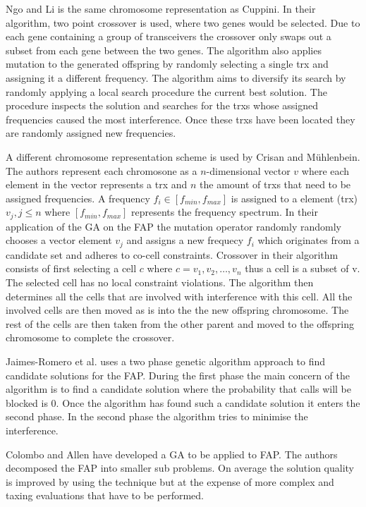 Ngo and Li\cite{} is the same chromosome representation as Cuppini\cite{}. In their algorithm, two point crossover is used, where two genes would be selected. Due to each gene containing a group of transceivers the crossover only swaps out a subset from each gene between the two genes. The algorithm also applies mutation to the generated offspring by randomly selecting a single trx and assigning it a different frequency. The algorithm aims to diversify its search by randomly applying a local search procedure the current best solution. The procedure inspects the solution and searches for the trxs whose assigned frequencies caused the most interference. Once these trxs have been located they are randomly assigned new frequencies.

A different chromosome representation scheme is used by Crisan and Mühlenbein\cite{}. The authors represent each chromosone as a $n$-dimensional vector $v$ where each element in the vector represents a trx and $n$ the amount of trxs that need to be assigned frequencies. A frequency $f_i \in [f_{min}, f_{max}]$ is assigned to a element (trx) $v_j, j \le n$ where $[f_{min}, f_{max}]$ represents the frequency spectrum. In their application of the \gls{GA} on the FAP the mutation operator randomly randomly chooses a vector element $v_j$ and assigns a new frequecy $f_i$ which originates from a candidate set and adheres to co-cell constraints. Crossover in their algorithm consists of first selecting a cell $c$ where $c = {v_1,v_2,\dots,v_n}$ thus a cell is a subset of v. The selected cell has no local constraint violations. The algorithm then determines all the cells that are involved with interference with this cell. All the involved cells are then moved as is into the the new offspring chromosome. The rest of the cells are then taken from the other parent and moved to the offspring chromosome to complete the crossover.

Jaimes-Romero et al.\cite{} uses a two phase genetic algorithm approach to find candidate solutions for the \gls{FAP}. During the first phase the main concern of the algorithm is to find a candidate solution where the probability that calls will be blocked is 0. Once the algorithm has found such a candidate solution it enters the second phase. In the second phase the algorithm tries to minimise the interference. 

Colombo and Allen\cite{ProblemDecompMIFAP} have developed a \gls{GA} to be applied to \gls{FAP}. The authors decomposed the \gls{FAP} into smaller sub problems. On average the solution quality is improved by using the technique but at the expense of more complex and taxing evaluations that have to be performed\cite{ProblemDecompMIFAP}. 

